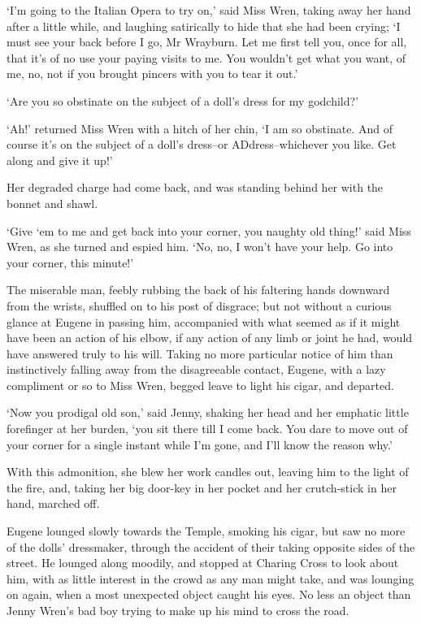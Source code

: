 ‘I’m going to the Italian Opera to try on,’ said Miss Wren, taking away
her hand after a little while, and laughing satirically to hide that she
had been crying; ‘I must see your back before I go, Mr Wrayburn. Let me
first tell you, once for all, that it’s of no use your paying visits
to me. You wouldn’t get what you want, of me, no, not if you brought
pincers with you to tear it out.’

‘Are you so obstinate on the subject of a doll’s dress for my godchild?’

‘Ah!’ returned Miss Wren with a hitch of her chin, ‘I am so
obstinate. And of course it’s on the subject of a doll’s dress--or
ADdress--whichever you like. Get along and give it up!’

Her degraded charge had come back, and was standing behind her with the
bonnet and shawl.

‘Give ‘em to me and get back into your corner, you naughty old thing!’
said Miss Wren, as she turned and espied him. ‘No, no, I won’t have your
help. Go into your corner, this minute!’

The miserable man, feebly rubbing the back of his faltering hands
downward from the wrists, shuffled on to his post of disgrace; but not
without a curious glance at Eugene in passing him, accompanied with what
seemed as if it might have been an action of his elbow, if any action of
any limb or joint he had, would have answered truly to his will. Taking
no more particular notice of him than instinctively falling away from
the disagreeable contact, Eugene, with a lazy compliment or so to Miss
Wren, begged leave to light his cigar, and departed.

‘Now you prodigal old son,’ said Jenny, shaking her head and her
emphatic little forefinger at her burden, ‘you sit there till I come
back. You dare to move out of your corner for a single instant while I’m
gone, and I’ll know the reason why.’

With this admonition, she blew her work candles out, leaving him to the
light of the fire, and, taking her big door-key in her pocket and her
crutch-stick in her hand, marched off.

Eugene lounged slowly towards the Temple, smoking his cigar, but saw
no more of the dolls’ dressmaker, through the accident of their taking
opposite sides of the street. He lounged along moodily, and stopped at
Charing Cross to look about him, with as little interest in the crowd
as any man might take, and was lounging on again, when a most unexpected
object caught his eyes. No less an object than Jenny Wren’s bad boy
trying to make up his mind to cross the road.

